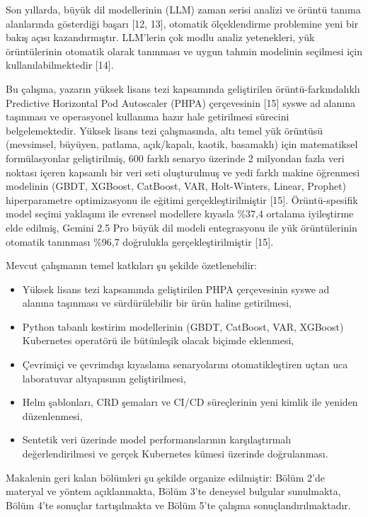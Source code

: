 \documentclass[12pt,a4paper]{article}
\begin{document}
Son yıllarda, büyük dil modellerinin (LLM) zaman serisi analizi ve örüntü tanıma alanlarında gösterdiği başarı [12, 13], otomatik ölçeklendirme problemine yeni bir bakış açısı kazandırmıştır. LLM'lerin çok modlu analiz yetenekleri, yük örüntülerinin otomatik olarak tanınması ve uygun tahmin modelinin seçilmesi için kullanılabilmektedir [14].

Bu çalışma, yazarın yüksek lisans tezi kapsamında geliştirilen örüntü-farkındalıklı Predictive Horizontal Pod Autoscaler (PHPA) çerçevesinin [15] syswe ad alanına taşınması ve operasyonel kullanıma hazır hale getirilmesi sürecini belgelemektedir. Yüksek lisans tezi çalışmasında, altı temel yük örüntüsü (mevsimsel, büyüyen, patlama, açık/kapalı, kaotik, basamaklı) için matematiksel formülasyonlar geliştirilmiş, 600 farklı senaryo üzerinde 2 milyondan fazla veri noktası içeren kapsamlı bir veri seti oluşturulmuş ve yedi farklı makine öğrenmesi modelinin (GBDT, XGBoost, CatBoost, VAR, Holt-Winters, Linear, Prophet) hiperparametre optimizasyonu ile eğitimi gerçekleştirilmiştir [15]. Örüntü-spesifik model seçimi yaklaşımı ile evrensel modellere kıyasla \%37,4 ortalama iyileştirme elde edilmiş, Gemini 2.5 Pro büyük dil modeli entegrasyonu ile yük örüntülerinin otomatik tanınması \%96,7 doğrulukla gerçekleştirilmiştir [15].

Mevcut çalışmanın temel katkıları şu şekilde özetlenebilir:

\begin{itemize}[noitemsep]
  \item Yüksek lisans tezi kapsamında geliştirilen PHPA çerçevesinin syswe ad alanına taşınması ve sürdürülebilir bir ürün haline getirilmesi,
  \item Python tabanlı kestirim modellerinin (GBDT, CatBoost, VAR, XGBoost) Kubernetes operatörü ile bütünleşik olacak biçimde eklenmesi,
  \item Çevrimiçi ve çevrimdışı kıyaslama senaryolarını otomatikleştiren uçtan uca laboratuvar altyapısının geliştirilmesi,
  \item Helm şablonları, CRD şemaları ve CI/CD süreçlerinin yeni kimlik ile yeniden düzenlenmesi,
  \item Sentetik veri üzerinde model performanslarının karşılaştırmalı değerlendirilmesi ve gerçek Kubernetes kümesi üzerinde doğrulanması.
\end{itemize}

Makalenin geri kalan bölümleri şu şekilde organize edilmiştir: Bölüm 2'de materyal ve yöntem açıklanmakta, Bölüm 3'te deneysel bulgular sunulmakta, Bölüm 4'te sonuçlar tartışılmakta ve Bölüm 5'te çalışma sonuçlandırılmaktadır.
\end{document}

